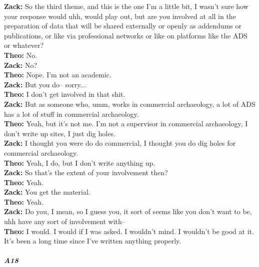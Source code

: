 \documentclass[
]{article}
\begin{document}
\textbf{Zack:} So the third theme, and this is the one I'm a little bit,
I wasn't sure how your response would uhh, would play out, but are you
involved at all in the preparation of data that will be shared
externally or openly as addendums or publications, or like via
professional networks or like on platforms like the ADS or whatever?\\
\textbf{Theo:} No.\\
\textbf{Zack:} No?\\
\textbf{Theo:} Nope. I'm not an academic.\\
\textbf{Zack:} But you do-- sorry...\\
\textbf{Theo:} I don't get involved in that shit.\\
\textbf{Zack:} But as someone who, umm, works in commercial archaeology,
a lot of ADS has a lot of stuff in commercial archaeology.\\
\textbf{Theo:} Yeah, but it's not me. I'm not a supervisor in commercial
archaeology, I don't write up sites, I just dig holes.\\
\textbf{Zack:} I thought you were do do commercial, I thought you do dig
holes for commercial archaeology.\\
\textbf{Theo:} Yeah, I do, but I don't write anything up.\\
\textbf{Zack:} So that's the extent of your involvement then?\\
\textbf{Theo:} Yeah.\\
\textbf{Zack:} You get the material.\\
\textbf{Theo:} Yeah.\\
\textbf{Zack:} Do you, I mean, so I guess you, it sort of seems like you
don't want to be, uhh have any sort of involvement with--\\
\textbf{Theo:} I would. I would if I was asked. I wouldn't mind. I
wouldn't be good at it. It's been a long time since I've written
anything properly.

\subparagraph{A18}\label{sec-A18}
\end{document}

